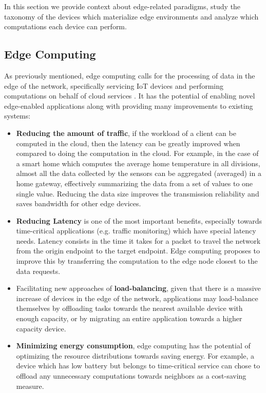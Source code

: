 
In this section we provide context about edge-related paradigms, study the taxonomy of the devices which materialize edge environments and analyze which computations each device can perform.

\subsection{Edge Computing}

As previously mentioned, edge computing calls for the processing of data in the edge of the network, specifically servicing IoT devices and performing computations on behalf of cloud services \cite{7488250}. It has the potential of enabling novel edge-enabled applications along with providing many improvements to existing systems:

\begin{itemize}

    \item \textbf{Reducing the amount of traffic}, if the workload of a client can be computed in the cloud, then the latency can be greatly improved when compared to doing the computation in the cloud. For example, in the case of a smart home which computes the average home temperature in all divisions, almost all the data collected by the sensors can be aggregated (averaged) in a home gateway, effectively summarizing the data from a set of values to one single value. Reducing the data size improves the transmission reliability and saves bandwidth for other edge devices.
    
    \item \textbf{Reducing Latency} is one of the most important benefits, especially towards time-critical applications (e.g. traffic monitoring) which have special latency needs. Latency consists in the time it takes for a packet to travel the network from the origin endpoint to the target endpoint. Edge computing proposes to improve this by transferring the computation to the edge node closest to the data requests.

    \item Facilitating new approaches of \textbf{load-balancing}, given that there is a massive increase of devices in the edge of the network, applications may load-balance themselves by offloading tasks towards the nearest available device with enough capacity, or by migrating an entire application towards a higher capacity device.
    
    \item \textbf{Minimizing energy consumption}, edge computing has the potential of optimizing the resource distributions towards saving energy. For example, a device which has low battery but belongs to time-critical service can chose to offload any unnecessary computations towards neighbors as a cost-saving measure. 
    
\end{itemize}

